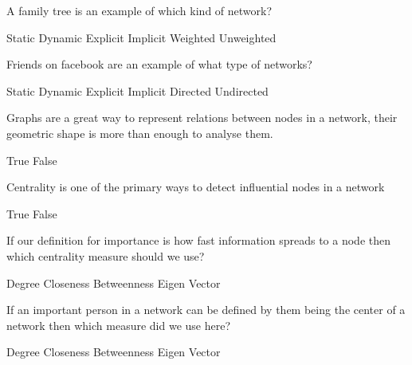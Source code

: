 \documentclass[theme=sleek, randomorder, hidesidemenu]{webquiz}
\begin{document}
\begin{question}
  A family tree is an example of which kind of network?
  \begin{choice}[columns=2, multiple]
    \correct Static
    \incorrect Dynamic
    \correct Explicit
    \incorrect Implicit
    \incorrect Weighted
    \incorrect Unweighted
  \end{choice}

\end{question}

\begin{question}
  Friends on facebook are an example of what type of networks?
  \begin{choice}[columns=2, multiple]
    \incorrect Static
    \correct Dynamic
    \correct Explicit
    \incorrect Implicit
    \incorrect Directed
    \correct Undirected
  \end{choice}
\end{question}

\begin{question}
  Graphs are a great way to represent relations between nodes in a network, their geometric shape is more than enough to analyse them.
  \begin{choice}
    \incorrect True
    \correct False
  \end{choice}
\end{question}

\begin{question}
  Centrality is one of the primary ways to detect influential nodes in a network
  \begin{choice}
    \correct True
    \incorrect False
  \end{choice}
\end{question}

\begin{question}
  If our definition for importance is how fast information spreads to a node then which centrality measure should we use?
  \begin{choice}
    \incorrect Degree
    \incorrect Closeness
    \correct Betweenness
    \incorrect Eigen Vector
  \end{choice}
\end{question}

\begin{question}
  If an important person in a network can be defined by them being the center of a network then which measure did we use here?
  \begin{choice}
    \correct Degree
    \incorrect Closeness
    \incorrect Betweenness
    \incorrect Eigen Vector
  \end{choice}
\end{question}
\end{document}
